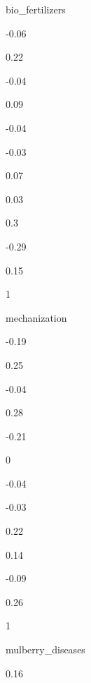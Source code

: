 \documentclass[
]{article}
\begin{document}
{ }

{ }

{ }

bio\_fertilizers

{-0.06}

{0.22 }

{-0.04}

{0.09 }

{-0.04}

{-0.03}

{0.07 }

{0.03 }

{0.3 }

{-0.29}

{0.15 }

{1 }

{ }

{ }

{ }

{ }

{ }

{ }

{ }

{ }

{ }

{ }

{ }

{ }

mechanization

{-0.19}

{0.25 }

{-0.04}

{0.28 }

{-0.21}

{0 }

{-0.04}

{-0.03}

{0.22 }

{0.14 }

{-0.09}

{0.26 }

{1 }

{ }

{ }

{ }

{ }

{ }

{ }

{ }

{ }

{ }

{ }

{ }

mulberry\_diseases

{0.16 }
\end{document}
